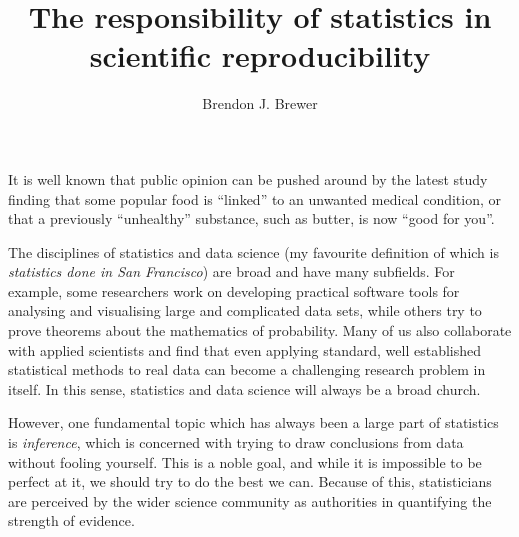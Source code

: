 \documentclass[a4paper, 11pt]{article}
\title{The responsibility of statistics in scientific reproducibility}
\author{Brendon J. Brewer}
\begin{document}
\maketitle

It is well known that public opinion can be pushed around by the latest study
finding that some popular food is ``linked'' to an unwanted medical condition,
or that a previously ``unhealthy'' substance, such as butter, is now
``good for you''.

The disciplines of statistics and data science
(my favourite definition of which is {\it statistics done in San Francisco})
are broad and have many subfields. For example, some researchers
work on developing practical software tools for analysing and visualising large and
complicated data sets, while others try to prove theorems about the mathematics
of probability. Many of us also collaborate with applied scientists and find
that even applying standard, well established statistical methods to
real data can become a challenging research problem in itself. In this sense,
statistics and data science will always be a broad church.

However, one fundamental topic which has always been a large part of
statistics is {\it inference}, which is concerned with trying to
draw conclusions from data without fooling yourself. This is a noble goal,
and while it is impossible to be perfect at it, we should try to do the best
we can. Because of this,
statisticians are perceived by the wider science community as authorities
in quantifying the strength of evidence.
\end{document}
